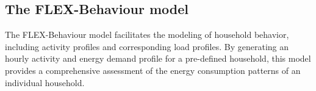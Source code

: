 





\subsection{The FLEX-Behaviour model}

The FLEX-Behaviour model \cite{newtrends} facilitates the modeling of household behavior, including activity profiles and corresponding load profiles. 
By generating an hourly activity and energy demand profile for a pre-defined household, this model provides a comprehensive assessment of the energy consumption patterns of an individual household.

